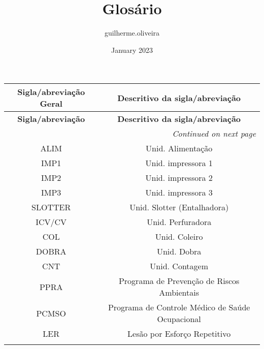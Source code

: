 \documentclass{article}
\title{Glosário}
\author{guilherme.oliveira }
\date{January 2023}
\begin{document}
\begin{longtable}{@{}c c@{}}
\textbf{Sigla/abreviação Geral} & \textbf{Descritivo da sigla/abreviação} \\
\midrule
\endfirsthead
\textbf{Sigla/abreviação} & \textbf{Descritivo da sigla/abreviação} \\
\midrule
\endhead
\midrule
\multicolumn{2}{r}{\textit{Continued on next page}}
\endfoot
\midrule
\endlastfoot

\gls{alm} & Alarme \\
\addlinespace[0.2cm]

\gls{ALIM} & Unid. Alimentação  \\
\addlinespace[0.2cm]

\gls{IMP1} & Unid. impressora 1 \\
\addlinespace[0.2cm]

\gls{IMP2} & Unid. impressora 2 \\
\addlinespace[0.2cm]

\gls{IMP3} & Unid. impressora 3 \\
\addlinespace[0.2cm]

\gls{SLOTTER} & Unid. Slotter (Entalhadora) \\
\addlinespace[0.2cm]

\gls{ICV/CV} & Unid. Perfuradora \\
\addlinespace[0.2cm]

\gls{COL} & Unid. Coleiro \\
\addlinespace[0.2cm]

\gls{DOBRA} & Unid. Dobra \\
\addlinespace[0.2cm]

\gls{CNT} & Unid. Contagem \\
\addlinespace[0.2cm]

\gls{PPRA} & Programa de Prevenção de Riscos Ambientais \\
\addlinespace[0.2cm]

\gls{PCMSO} & Programa de Controle Médico de Saúde Ocupacional \\
\addlinespace[0.2cm]

\gls{LER} & Lesão por Esforço Repetitivo \\
\addlinespace[0.2cm]

\end{longtable}
\end{document}
